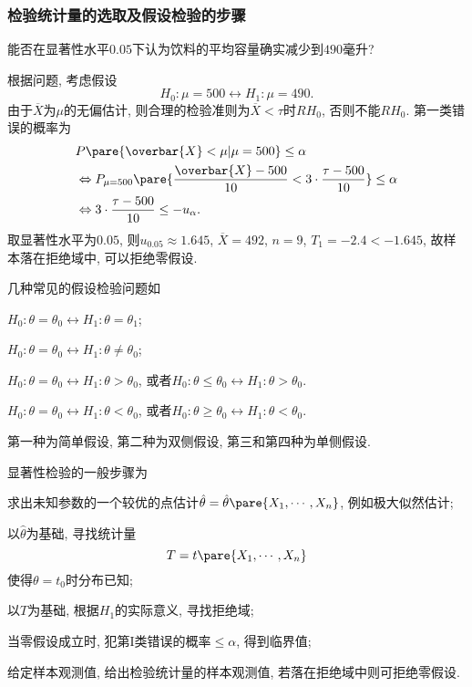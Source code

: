 \documentclass[../Statistics.tex]{subfiles}
\begin{document}

\subsubsection{检验统计量的选取及假设检验的步骤} %
\label{ssub:检验统计量的选取及假设检验的步骤}

\begin{sample}
    \begin{ex}
        能否在显著性水平$0.05$下认为饮料的平均容量确实减少到$490$毫升?
    \end{ex}
    \begin{solution}
        根据问题, 考虑假设
        \[ H_0: \mu = 500 \leftrightarrow H_1: \mu = 490. \]
        由于$\overbar{X}$为$\mu$的无偏估计, 则合理的检验准则为$\overbar{X}<\tau$时$RH_0$, 否则不能$RH_0$. 第一类错误的概率为
        \begin{align*}
            & P\pare{\overbar{X}<\mu \vert \mu = 500} \le \alpha \\
            &\Leftrightarrow P_{\mu = 500} \pare{\frac{\overbar{X}-500}{10} < 3\cdot \frac{\tau - 500}{10}} \le \alpha \\
            &\Leftrightarrow 3\cdot \frac{\tau - 500}{10} \le -u_\alpha.
        \end{align*}
        取显著性水平为$0.05$, 则$u_{0.05}\approx 1.645$, $\overbar{X} = 492$, $n=9$, $T_1 = -2.4 < -1.645$, 故样本落在拒绝域中, 可以拒绝零假设.
    \end{solution}
\end{sample}
几种常见的假设检验问题如
\begin{cenum}
    \item $H_0: \theta = \theta_0 \leftrightarrow H_1: \theta = \theta_1$;
    \item $H_0: \theta = \theta_0 \leftrightarrow H_1: \theta \neq \theta_0$;
    \item $H_0: \theta = \theta_0 \leftrightarrow H_1: \theta>\theta_0$, 或者$H_0: \theta \le \theta_0 \leftrightarrow H_1: \theta>\theta_0$.
    \item $H_0: \theta = \theta_0 \leftrightarrow H_1: \theta<\theta_0$, 或者$H_0: \theta \ge \theta_0 \leftrightarrow H_1: \theta<\theta_0$.
\end{cenum}
第一种为简单假设, 第二种为双侧假设, 第三和第四种为单侧假设.
\par
显著性检验的一般步骤为
\begin{cenum}
    \item 求出未知参数的一个较优的点估计$\hat\theta = \hat\theta\pare{X_1,\cdots,X_n}$, 例如极大似然估计;
    \item 以$\hat\theta$为基础, 寻找统计量
    \[ T = t\pare{X_1,\cdots,X_n} \]
    使得$\theta = t_0$时分布已知;
    \item 以$T$为基础, 根据$H_1$的实际意义, 寻找拒绝域;
    \item 当零假设成立时, 犯第I类错误的概率$\le \alpha$, 得到临界值;
    \item 给定样本观测值, 给出检验统计量的样本观测值, 若落在拒绝域中则可拒绝零假设.
\end{cenum}
\end{document}
